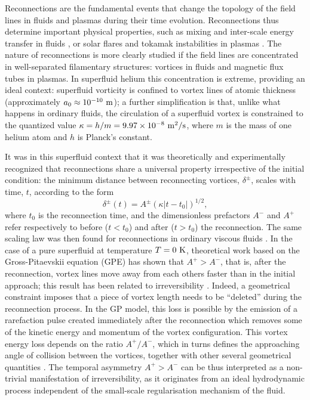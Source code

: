 \documentclass[9pt,twocolumn,twoside]{pnas-new}
\begin{document}
Reconnections are the fundamental events that
change the topology of the field lines in fluids and plasmas during their time evolution. Reconnections thus determine important physical properties, such as mixing and inter-scale energy transfer in fluids \cite{YaoHussainAnnRev2022}, or solar flares and tokamak instabilities in plasmas \cite{Chapman2010}. The nature of reconnections is more clearly studied if the field lines are concentrated in well-separated filamentary structures: vortices in fluids and magnetic flux tubes in plasmas. In superfluid helium this concentration is extreme, providing an ideal context: superfluid vorticity is confined to vortex lines of atomic thickness (approximately $a_0 \approx 10^{-10}~\rm m$); a further simplification 
is that, unlike what happens in ordinary fluids, the
circulation of a superfluid vortex  is constrained to the quantized value $\kappa=h/m=9.97 \times 10^{-8}~\rm m^2/s$, 
where $m$ is the mass of one helium atom and $h$ is Planck's constant. 

It was in this superfluid context that it was theoretically and experimentally recognized
\cite{nazarenko2003,bewley2008,paoletti2010,zuccherQuantumVortexReconnections2012a,villoisUniversalNonuniversalAspects2017a,galantucciCrossoverInteractionDriven2019a,tylutki2021universal}
that reconnections share a universal property irrespective of the initial
condition: the minimum distance between reconnecting 
vortices, $\delta^{\pm}$, scales with time, $t$, according to the form
\begin{equation}
\label{eq:scaling}
	\delta^{\pm}(t) = A^{\pm} (\kappa|t-t_0|)^{1/2},
\end{equation} 
\noindent
where $t_0$ is the reconnection time, and the dimensionless
prefactors $A^-$ and $A^+$ refer respectively to before
($t<t_0$) and after ($t>t_0$) the reconnection. The same scaling law
was then found for reconnections in ordinary viscous fluids 
\cite{yaoSeparationScalingViscous2020}. In the case of a pure
superfluid at temperature $T=0~\rm K$, theoretical work based on
the Gross-Pitaevskii equation (GPE) has shown that
$A^+>A^-$, that is, after the reconnection, vortex lines move away from 
each others faster than in the initial approach; this result has been
related to irreversibility \cite{villoisIrreversibleDynamicsVortex2020,promentMatchingTheoryCharacterize2020}. Indeed, a geometrical constraint imposes 
\cite{promentMatchingTheoryCharacterize2020}
that a piece of vortex length needs to be ``deleted'' 
during the reconnection process. In the GP model, this loss is possible 
by the emission of a rarefaction pulse created immediately after 
the reconnection
\cite{leadbeaterSoundEmissionDue2001b,zuccherQuantumVortexReconnections2012a} which removes some of the kinetic energy and momentum of the vortex configuration.
This vortex energy loss depends on
the ratio $A^+/A^-$, which in turns defines the approaching angle of collision
between the vortices, together with other several geometrical quantities \cite{villoisUniversalNonuniversalAspects2017a,promentMatchingTheoryCharacterize2020}. 
The temporal asymmetry $A^+>A^-$ can be thus interpreted as a non-trivial manifestation of irreversibility, as it originates from an ideal hydrodynamic process independent of the small-scale regularisation mechanism of the fluid.
\end{document}
